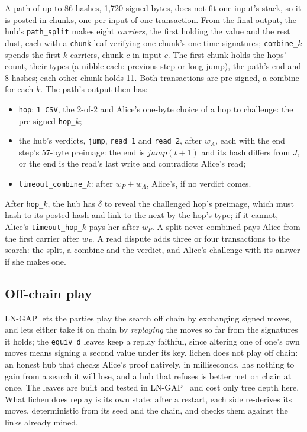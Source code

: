 \documentclass[11pt]{article}
\newcommand{\tx}[1]{\texttt{#1}}
\begin{document}
A path of up to 86 hashes, 1,720 signed bytes, does not fit one input's
stack, so it is posted in chunks, one per input of one transaction. From
the final output, the hub's \tx{path\_split} makes eight \emph{carriers},
the first holding the value and the rest dust, each with a \tx{chunk}
leaf verifying one chunk's one-time signatures; \tx{combine\_$k$} spends
the first $k$ carriers, chunk $c$ in input $c$. The first chunk holds the
hops' count, their types (a nibble each: previous step or long jump),
the path's end and 8 hashes; each other chunk holds 11. Both
transactions are pre-signed, a combine for each $k$. The path's output
then has:
\begin{itemize}[leftmargin=1.5em]
\item \tx{hop}: \texttt{1 CSV}, the 2-of-2 and Alice's one-byte choice
  of a hop to challenge: the pre-signed \tx{hop\_$k$};
\item the hub's verdicts, \tx{jump}, \tx{read\_1} and \tx{read\_2},
  after $w_A$, each with the end step's 57-byte preimage: the end is
  $\mathit{jump}(t+1)$ and its hash differs from $J$, or the end is the
  read's last write and contradicts Alice's read;
\item \tx{timeout\_combine\_$k$}: after $w_P + w_A$, Alice's, if no
  verdict comes.
\end{itemize}
After \tx{hop\_$k$}, the hub has $\delta$ to reveal the challenged
hop's preimage, which must hash to its posted hash and link to the next
by the hop's type; if it cannot, Alice's \tx{timeout\_hop\_$k$} pays her
after $w_P$. A split never combined pays Alice from the first carrier
after $w_P$. A read dispute adds three or four transactions to the
search: the split, a combine and the verdict, and Alice's challenge with
its answer if she makes one.

\subsection{Off-chain play}
\label{sec:offchain}

LN-GAP lets the parties play the search off chain by exchanging signed
moves, and lets either take it on chain by \emph{replaying} the moves
so far from the signatures it holds; the \tx{equiv\_d} leaves keep a
replay faithful, since altering one of one's own moves means signing a
second value under its key. lichen does not play off chain: an honest
hub that checks Alice's proof natively, in milliseconds, has nothing to
gain from a search it will lose, and a hub that refuses is better met on
chain at once. The leaves are built and tested in LN-GAP~\cite{lngapcode}
and cost only tree depth here. What lichen does replay is its own
state: after a restart, each side re-derives its moves, deterministic
from its seed and the chain, and checks them against the links already
mined.
\end{document}
